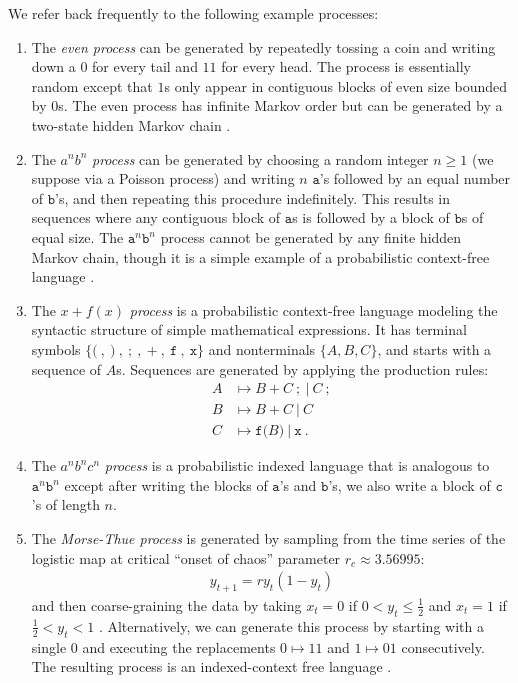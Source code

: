 \documentclass[sigconf, anonymous, review]{acmart}
\begin{document}
We refer back frequently to the following example processes:
\begin{enumerate}
\item The \emph{even process} can be generated by repeatedly tossing a coin
	and writing down a $0$ for every tail and $11$ for every head. The process
	is essentially random except that $1$s only appear in contiguous blocks of
	even size bounded by $0$s. The even process has infinite Markov order but
	can be generated by a two-state hidden Markov chain \cite{Crut01a}.
\item The $a^n b^n$ \emph{process} can be generated by choosing a random
	integer $n\geq 1$ (we suppose via a Poisson process) and writing $n$
	$\mathtt{a}$'s followed by an equal number of $\mathtt{b}$'s, and then
	repeating this procedure indefinitely. This results in sequences where any
	contiguous block of $\mathtt{a}$s is followed by a block of $\mathtt{b}$s
	of equal size. The $\mathtt{a}^n \mathtt{b}^n$ process cannot be generated
	by any finite hidden Markov chain, though it is a simple example of a
	probabilistic context-free language \cite{Hopc06a}.
\item The $x+f(x)$ \emph{process} is a probabilistic context-free language
	modeling the syntactic structure of simple mathematical expressions. It has
	terminal symbols $\{\mathtt{(}\ ,\ \mathtt{)}\ ,\ \mathtt{;}\ ,\
	\mathtt{+}\ ,\ \mathtt{f}\ ,\ \mathtt{x}\}$ and nonterminals $\{A,B,C\}$,
	and starts with a sequence of $A$s. Sequences are generated by applying the
	production rules:
\begin{align*}
    A &\mapsto B\ \mathtt{+}\ C\ \mathtt{;}\ |\ C\ \mathtt{;}\\
    B &\mapsto B\ \mathtt{+}\ C\ |\ C\\
    C &\mapsto \mathtt{f(}B\mathtt{)}\ |\ \mathtt{x}
  ~.
\end{align*}
\item The $a^n b^n c^n$ \emph{process} is a probabilistic indexed language
	\cite{Hopc06a} that is analogous to $\mathtt{a}^n \mathtt{b}^n$ except
	after writing the blocks of $\mathtt{a}$'s and $\mathtt{b}$'s, we also
	write a block of $\mathtt{c}$'s of length $n$.
\item The \emph{Morse-Thue process} is generated by sampling from the time
	series of the logistic map at critical ``onset of chaos'' parameter
	$r_c \approx 3.56995$:
\begin{align*}
    y_{t+1} = r y_t(1-y_t)
\end{align*}
	and then coarse-graining the data by taking $x_t = 0$ if $0< y_t \leq
	\frac{1}{2}$ and $x_t = 1$ if $\frac{1}{2} < y_t <1$ \cite{Kurk03a}.
	Alternatively, we can generate this process by starting with a single $0$
	and executing the replacements $0 \mapsto 11$ and $1 \mapsto 01$
	consecutively. The resulting process is an indexed-context free language
	\cite{Crut92c}.
\end{enumerate}
\end{document}
